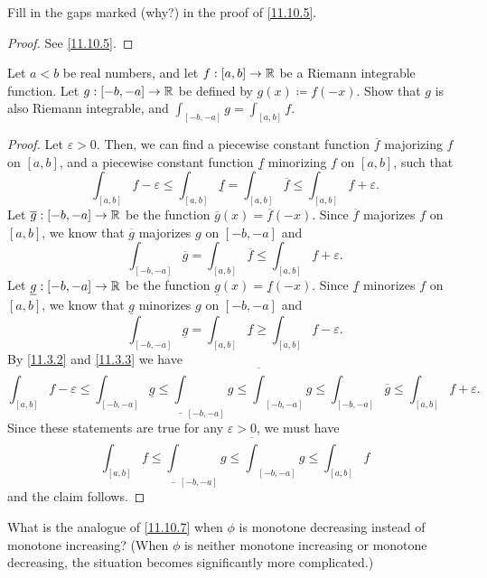 \begin{ex}\label{ex:11.10.2}
  Fill in the gaps marked (why?) in the proof of \cref{11.10.5}.
\end{ex}

\begin{proof}
  See \cref{11.10.5}.
\end{proof}

\begin{ex}\label{ex:11.10.3}
  Let \(a < b\) be real numbers, and let \(f : [a, b] \to \mathbb{R}\) be a Riemann integrable function.
  Let \(g : [-b, -a] \to \mathbb{R}\) be defined by \(g(x) \coloneqq f(-x)\).
  Show that \(g\) is also Riemann integrable, and \(\int_{[-b, -a]} g = \int_{[a, b]} f\).
\end{ex}

\begin{proof}
  Let \(\varepsilon > 0\).
  Then, we can find a piecewise constant function \(\overline{f}\) majorizing \(f\) on \([a, b]\), and a piecewise constant function \(\underline{f}\) minorizing \(f\) on \([a, b]\), such that
  \[
    \int_{[a, b]} f - \varepsilon \leq \int_{[a, b]} \underline{f} = \int_{[a, b]} \overline{f} \leq \int_{[a, b]} f + \varepsilon.
  \]
  Let \(\overline{g} : [-b, -a] \to \mathbb{R}\) be the function \(\overline{g}(x) = \overline{f}(-x)\).
  Since \(\overline{f}\) majorizes \(f\) on \([a, b]\), we know that \(\overline{g}\) majorizes \(g\) on \([-b, -a]\) and
  \[
    \int_{[-b, -a]} \overline{g} = \int_{[a, b]} \overline{f} \leq \int_{[a, b]} f + \varepsilon.
  \]
  Let \(\underline{g} : [-b, -a] \to \mathbb{R}\) be the function \(\underline{g}(x) = \underline{f}(-x)\).
  Since \(\underline{f}\) minorizes \(f\) on \([a, b]\), we know that \(\underline{g}\) minorizes \(g\) on \([-b, -a]\) and
  \[
    \int_{[-b, -a]} \underline{g} = \int_{[a, b]} \underline{f} \geq \int_{[a, b]} f - \varepsilon.
  \]
  By \cref{11.3.2} and \cref{11.3.3} we have
  \[
    \int_{[a, b]} f - \varepsilon \leq \int_{[-b, -a]} \underline{g} \leq \underline{\int}_{[-b, -a]} g \leq \overline{\int}_{[-b, -a]} g \leq \int_{[-b, -a]} \overline{g} \leq \int_{[a, b]} f + \varepsilon.
  \]
  Since these statements are true for any \(\varepsilon > 0\), we must have
  \[
    \int_{[a, b]} f \leq \underline{\int}_{[-b, -a]} g \leq \overline{\int}_{[-b, -a]} g \leq \int_{[a, b]} f
  \]
  and the claim follows.
\end{proof}

\begin{ex}\label{ex:11.10.4}
  What is the analogue of \cref{11.10.7} when \(\phi\) is monotone decreasing instead of monotone increasing?
  (When \(\phi\) is neither monotone increasing or monotone decreasing, the situation becomes significantly more complicated.)
\end{ex}

